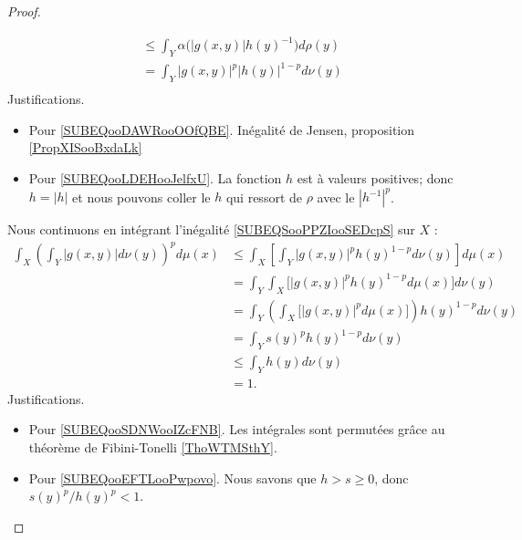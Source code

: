 \begin{proof}
\begin{subproof}
\begin{subequations}
\begin{align}
				                                       & \leq \int_Y\alpha\big( |g(x,y)|h(y)^{-1} \big)d\rho(y)       \label{SUBEQooDAWRooOOfQBE} \\
				                                       & =\int_Y| g(x,y) |^p| h(y) |^{1-p}d\nu(y)           \label{SUBEQooLDEHooJelfxU}           \\
			\end{align}
		\end{subequations}
		Justifications.
		\begin{itemize}
			\item Pour \eqref{SUBEQooDAWRooOOfQBE}. Inégalité de Jensen, proposition \ref{PropXISooBxdaLk}
			\item Pour \eqref{SUBEQooLDEHooJelfxU}. La fonction \( h\) est à valeurs positives; donc \( h=| h |\) et nous pouvons coller le \( h\) qui ressort de \( \rho\) avec le \( | h^{-1} |^p\).
		\end{itemize}
		Nous continuons en intégrant l'inégalité \eqref{SUBEQSooPPZIooSEDcpS} sur \( X\) :
		\begin{subequations}
			\begin{align}
				\int_X\left( \int_Y| g(x,y) |d\nu(y) \right)^pd\mu(x) & \leq\int_X\left[ \int_Y | g(x,y) |^ph(y)^{1-p}d\nu(y) \right]d\mu(x)                           \\
				                                                      & =\int_Y\int_X\big[ | g(x,y) |^ph(y)^{1-p}d\mu(x) \big]d\nu(y)      \label{SUBEQooSDNWooIZcFNB} \\
				                                                      & =\int_Y\left( \int_X\big[ | g(x,y) |^pd\mu(x) \big]\right)h(y)^{1-p}d\nu(y)                    \\
				                                                      & =\int_Y s(y)^ph(y)^{1-p}d\nu(y)                                                                \\
				                                                      & \leq \int_Yh(y)d\nu(y)     \label{SUBEQooEFTLooPwpovo}                                         \\
				                                                      & =1.
			\end{align}
		\end{subequations}
		Justifications.
		\begin{itemize}
			\item Pour \eqref{SUBEQooSDNWooIZcFNB}. Les intégrales sont permutées grâce au théorème de Fibini-Tonelli \ref{ThoWTMSthY}.
			\item Pour \eqref{SUBEQooEFTLooPwpovo}. Nous savons que \( h>s\geq 0\), donc \( s(y)^p/h(y)^p<1 \).

\end{itemize}
\end{subproof}
\end{proof}
